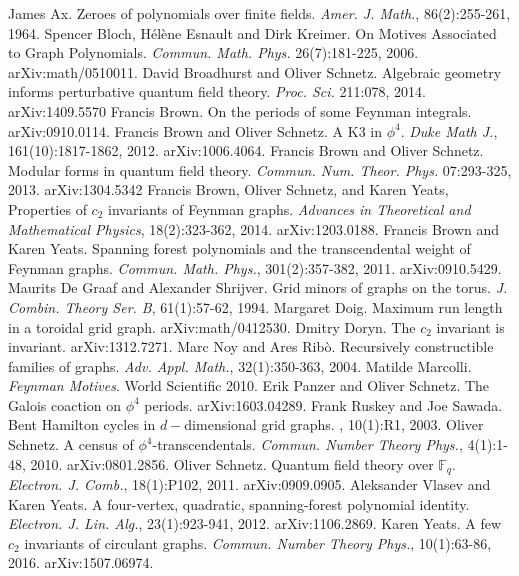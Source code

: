 \documentclass[12pt]{amsart}
\numberwithin{definition}{section}
\begin{document}
\begin{thebibliography}{99}
James Ax. Zeroes of polynomials over finite fields. \textit{Amer. J. Math.}, 86(2):255-261, 1964.
 Spencer Bloch, H\'el\`ene Esnault and Dirk Kreimer.  On Motives Associated to Graph Polynomials. \emph{Commun. Math. Phys.} 26(7):181-225, 2006. arXiv:math/0510011.
 David Broadhurst and Oliver Schnetz. Algebraic geometry informs perturbative quantum field theory. \emph{Proc. Sci.} 211:078, 2014. arXiv:1409.5570
 Francis Brown. On the periods of some Feynman integrals. arXiv:0910.0114.
 Francis Brown and Oliver Schnetz. A K3 in $\phi^4$. \textit{Duke Math J.}, 161(10):1817-1862, 2012. arXiv:1006.4064.
 Francis Brown and Oliver Schnetz. Modular forms in quantum field theory.  \textit{Commun. Num. Theor. Phys.} 07:293-325, 2013. arXiv:1304.5342
 Francis Brown, Oliver Schnetz, and Karen Yeats, Properties of $c_2$ invariants of Feynman graphs. \emph{Advances in Theoretical and Mathematical Physics}, 18(2):323-362, 2014. arXiv:1203.0188. 
 Francis Brown and Karen Yeats. Spanning forest polynomials and the transcendental weight of Feynman graphs. \textit{Commun. Math. Phys.}, 301(2):357-382, 2011. arXiv:0910.5429. 
 Maurits De Graaf and Alexander Shrijver. Grid minors of graphs on the torus. \textit{J. Combin. Theory Ser. B}, 61(1):57-62, 1994. 
 Margaret Doig. Maximum run length in a toroidal grid graph. arXiv:math/0412530. 
 Dmitry Doryn. The $c_2$ invariant is invariant. arXiv:1312.7271.
 Marc Noy and Ares Rib\`{o}. Recursively constructible families of graphs. \textit{Adv. Appl. Math.}, 32(1):350-363, 2004.
 Matilde Marcolli.  \emph{Feynman Motives}. World Scientific 2010.
 Erik Panzer and Oliver Schnetz. The Galois coaction on $\phi^4$ periods.  arXiv:1603.04289.
 Frank Ruskey and Joe Sawada. Bent Hamilton cycles in $d-$dimensional grid graphs. , 10(1):R1, 2003. 
 Oliver Schnetz. A census of $\phi^4$-transcendentals. \textit{Commun. Number Theory Phys.}, 4(1):1-48, 2010. arXiv:0801.2856.
 Oliver Schnetz. Quantum field theory over $\mathds{F}_q$. \textit{Electron. J. Comb.}, 18(1):P102, 2011. arXiv:0909.0905.
 Aleksander Vlasev and Karen Yeats. A four-vertex, quadratic, spanning-forest polynomial identity. \textit{Electron. J. Lin. Alg.}, 23(1):923-941, 2012. arXiv:1106.2869.
 Karen Yeats. A few $c_2$ invariants of circulant graphs. \textit{Commun. Number Theory Phys.}, 10(1):63-86, 2016. arXiv:1507.06974.

\end{thebibliography}

 
\end{document}
